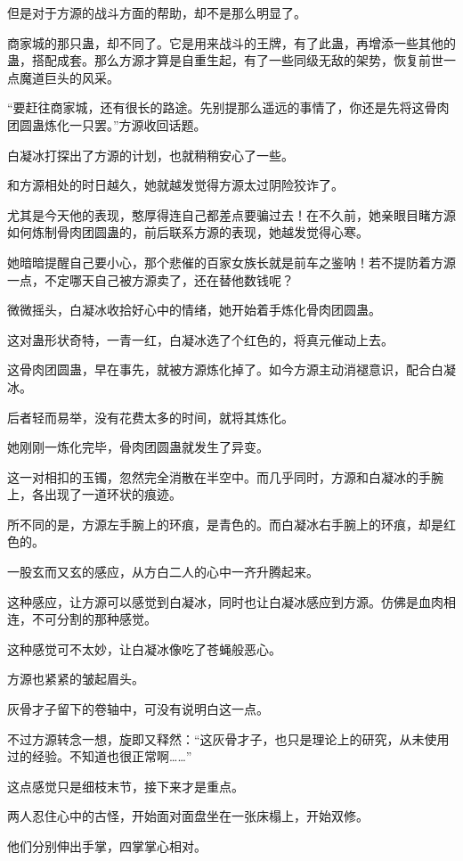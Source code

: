 \begin{this_body}
但是对于方源的战斗方面的帮助，却不是那么明显了。

商家城的那只蛊，却不同了。它是用来战斗的王牌，有了此蛊，再增添一些其他的蛊，搭配成套。那么方源才算是自重生起，有了一些同级无敌的架势，恢复前世一点魔道巨头的风采。

“要赶往商家城，还有很长的路途。先别提那么遥远的事情了，你还是先将这骨肉团圆蛊炼化一只罢。”方源收回话题。

白凝冰打探出了方源的计划，也就稍稍安心了一些。

和方源相处的时日越久，她就越发觉得方源太过阴险狡诈了。

尤其是今天他的表现，憨厚得连自己都差点要骗过去！在不久前，她亲眼目睹方源如何炼制骨肉团圆蛊的，前后联系方源的表现，她越发觉得心寒。

她暗暗提醒自己要小心，那个悲催的百家女族长就是前车之鉴呐！若不提防着方源一点，不定哪天自己被方源卖了，还在替他数钱呢？

微微摇头，白凝冰收拾好心中的情绪，她开始着手炼化骨肉团圆蛊。

这对蛊形状奇特，一青一红，白凝冰选了个红色的，将真元催动上去。

这骨肉团圆蛊，早在事先，就被方源炼化掉了。如今方源主动消褪意识，配合白凝冰。

后者轻而易举，没有花费太多的时间，就将其炼化。

她刚刚一炼化完毕，骨肉团圆蛊就发生了异变。

这一对相扣的玉镯，忽然完全消散在半空中。而几乎同时，方源和白凝冰的手腕上，各出现了一道环状的痕迹。

所不同的是，方源左手腕上的环痕，是青色的。而白凝冰右手腕上的环痕，却是红色的。

一股玄而又玄的感应，从方白二人的心中一齐升腾起来。

这种感应，让方源可以感觉到白凝冰，同时也让白凝冰感应到方源。仿佛是血肉相连，不可分割的那种感觉。

这种感觉可不太妙，让白凝冰像吃了苍蝇般恶心。

方源也紧紧的皱起眉头。

灰骨才子留下的卷轴中，可没有说明白这一点。

不过方源转念一想，旋即又释然：“这灰骨才子，也只是理论上的研究，从未使用过的经验。不知道也很正常啊……”

这点感觉只是细枝末节，接下来才是重点。

两人忍住心中的古怪，开始面对面盘坐在一张床榻上，开始双修。

他们分别伸出手掌，四掌掌心相对。


\end{this_body}
